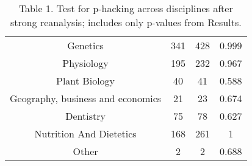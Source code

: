 \begin{table}
\begin{tabular}{ c c c c }
    Genetics & 341   & 428   & 0.999 \\
    Physiology & 195   & 232   & 0.967 \\
    Plant Biology & 40    & 41    & 0.588 \\
    Geography, business and economics & 21    & 23    & 0.674 \\
    Dentistry & 75    & 78    & 0.627 \\
    Nutrition And Dietetics & 168   & 261   & 1 \\
    Other & 2     & 2     & 0.688 \\
\end{tabular}
\caption{Table 1. Test for p-hacking across disciplines after strong reanalysis; includes only p-values from Results.}
\end{table}